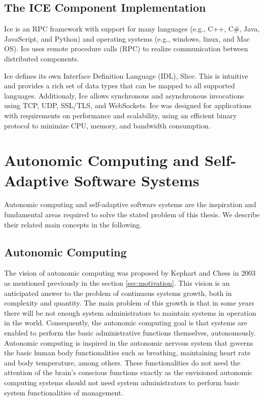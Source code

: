 \subsection {The ICE Component Implementation}

Ice is an RPC framework with support for many languages (e.g., C++, C\#, Java, JavaScript, and Python) and operating systems (e.g., windows, linux, and Mac OS). Ice uses remote procedure calls (RPC) to realize communication between distributed components. 

Ice defines its own Interface Definition Language (IDL), Slice. This is intuitive and provides a rich set of data types that can be mapped to all supported languages. Additionaly, Ice allows synchronous and asynchronous invocations using TCP, UDP, SSL/TLS, and WebSockets. Ice was designed for applications with requirements on performance and scalability, using an efficient binary protocol to minimize CPU, memory, and bandwidth consumption.

\section {Autonomic Computing and Self-Adaptive Software Systems}

Autonomic computing and self-adaptive software systems are the inspiration and fundamental areas required to solve the stated problem of this thesis. We describe their related main concepts in the following.

\subsection {Autonomic Computing}
The vision of autonomic computing was proposed by Kephart and Chess in 2003 as mentioned previously in the section \ref{sec:motivation}. This vision is an anticipated answer to the problem of continuous systems growth, both in complexity and quantity. The main problem of this growth is that in some years there will be not enough system administrators to maintain systems in operation in the world. Consequently, the autonomic computing goal is that systems are enabled to perform the basic administrative functions themselves, autonomously. Autonomic computing is inspired in the autonomic nervous system that governs the basic human body functionalities such as breathing, maintaining heart rate and body temperature, among others. These functionalities do not need the attention of the brain's conscious functions exactly as the envisioned autonomic computing systems should not need system administrators to perform basic system functionalities of management.


